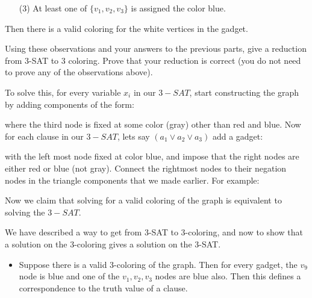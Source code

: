 \documentclass{article}
\begin{document}
\begin{itemize}
\begin{itemize}
\begin{itemize}
                        \item [(3)] At least one of $\{v_{1} ,v_{2}, v_{3}\}$ is assigned the color blue.
                    \end{itemize}
                Then there is a valid coloring for the white vertices in the gadget.
            \end{itemize}
            Using these observations and your answers to the previous parts, give a reduction from $3$-SAT to $3$ coloring. Prove that your reduction is correct (you do not need to prove any of the observations above).
                \begin{answer}
                    To solve this, for every variable $x_{i}$ in our $3-SAT$, start constructing the graph by adding components of the form:
                        \begin{center}
                            \begin{fixedfigure}
                            \end{fixedfigure}
                        \end{center}
                    where the third node is fixed at some color (gray) other than red and blue. Now for each clause in our $3-SAT$, lets say $(a_{1} \lor a_{2} \lor a_{3})$ add a gadget:
                        \begin{center}
                            \begin{fixedfigure}
                            \end{fixedfigure}
                        \end{center}
                    with the left most node fixed at color blue, and impose that the right nodes are either red or blue (not gray). Connect the rightmost nodes to their negation nodes in the triangle components that we made earlier. For example:
                        \begin{center}
                            \begin{fixedfigure}
                            \end{fixedfigure}
                        \end{center}
                    Now we claim that solving for a valid coloring of the graph is equivalent to solving the $3-SAT$.

                    We have described a way to get from $3$-SAT to $3$-coloring, and now to show that a solution on the $3$-coloring gives a solution on the $3$-SAT.
                        \begin{itemize}
                            \item Suppose there is a valid $3$-coloring of the graph. Then for every gadget, the $v_{9}$ node is blue and one of the $v_{1}, v_{2}, v_{3}$ nodes are blue also. Then this defines a correspondence to the truth value of a clause.


\end{itemize}
\end{answer}
\end{itemize}
\end{document}
